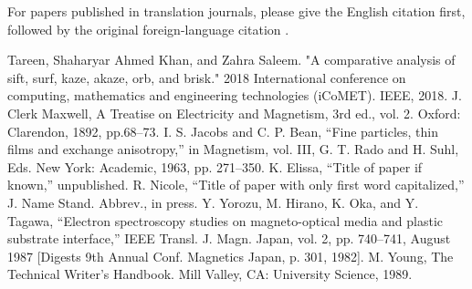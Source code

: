 \documentclass[conference]{IEEEtran}
\begin{document}
For papers published in translation journals, please give the English 
citation first, followed by the original foreign-language citation \cite{b6}.

\begin{thebibliography}{00}
 Tareen, Shaharyar Ahmed Khan, and Zahra Saleem. "A comparative analysis of sift, surf, kaze, akaze, orb, and brisk." 2018 International conference on computing, mathematics and engineering technologies (iCoMET). IEEE, 2018.
 J. Clerk Maxwell, A Treatise on Electricity and Magnetism, 3rd ed., vol. 2. Oxford: Clarendon, 1892, pp.68--73.
 I. S. Jacobs and C. P. Bean, ``Fine particles, thin films and exchange anisotropy,'' in Magnetism, vol. III, G. T. Rado and H. Suhl, Eds. New York: Academic, 1963, pp. 271--350.
 K. Elissa, ``Title of paper if known,'' unpublished.
 R. Nicole, ``Title of paper with only first word capitalized,'' J. Name Stand. Abbrev., in press.
 Y. Yorozu, M. Hirano, K. Oka, and Y. Tagawa, ``Electron spectroscopy studies on magneto-optical media and plastic substrate interface,'' IEEE Transl. J. Magn. Japan, vol. 2, pp. 740--741, August 1987 [Digests 9th Annual Conf. Magnetics Japan, p. 301, 1982].
 M. Young, The Technical Writer's Handbook. Mill Valley, CA: University Science, 1989.
\end{thebibliography}
\end{document}
